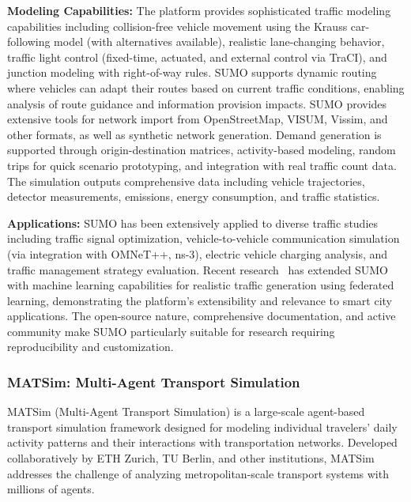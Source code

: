 \textbf{Modeling Capabilities:} The platform provides sophisticated traffic modeling capabilities including collision-free vehicle movement using the Krauss car-following model (with alternatives available), realistic lane-changing behavior, traffic light control (fixed-time, actuated, and external control via TraCI), and junction modeling with right-of-way rules. SUMO supports dynamic routing where vehicles can adapt their routes based on current traffic conditions, enabling analysis of route guidance and information provision impacts. SUMO provides extensive tools for network import from OpenStreetMap, VISUM, Vissim, and other formats, as well as synthetic network generation. Demand generation is supported through origin-destination matrices, activity-based modeling, random trips for quick scenario prototyping, and integration with real traffic count data. The simulation outputs comprehensive data including vehicle trajectories, detector measurements, emissions, energy consumption, and traffic statistics.

\textbf{Applications:} SUMO has been extensively applied to diverse traffic studies including traffic signal optimization, vehicle-to-vehicle communication simulation (via integration with OMNeT++, ns-3), electric vehicle charging analysis, and traffic management strategy evaluation. Recent research~\cite{sumo_federated} has extended SUMO with machine learning capabilities for realistic traffic generation using federated learning, demonstrating the platform's extensibility and relevance to smart city applications. The open-source nature, comprehensive documentation, and active community make SUMO particularly suitable for research requiring reproducibility and customization.


\subsubsection{MATSim: Multi-Agent Transport Simulation}

MATSim (Multi-Agent Transport Simulation) is a large-scale agent-based transport simulation framework designed for modeling individual travelers' daily activity patterns and their interactions with transportation networks. Developed collaboratively by ETH Zurich, TU Berlin, and other institutions, MATSim addresses the challenge of analyzing metropolitan-scale transport systems with millions of agents.

